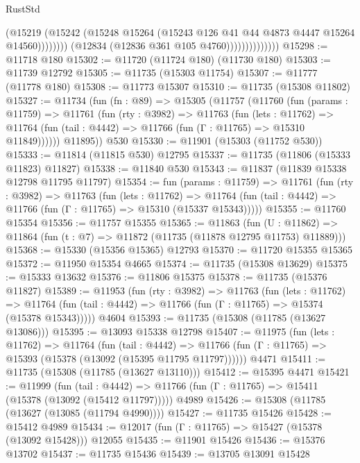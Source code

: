 \begin{lexlean}{RustStd}
\begin{coremodule}
{\begin{coremodule}
{{{{{{{{{{{{{{{{{{{{{{{{{{{{{{{{{{{{{{{{{{{{{{{{{{{{{{{{{{{{{{{{{{{{                                    (@15219
                                      (@15242
                                        (@15248
                                          @15264
                                          (@15243 @126 @41 @44 @4873 @4447 @15264 @14560))))))))
                            (@12834 (@12836 @361 @105 @4760))))))))))))))
@15298 := @11718 @180
@15302 := @11720 (@11724 @180) (@11730 @180)
@15303 := @11739 @12792
@15305 := @11735 (@15303 @11754)
@15307 := @11777 (@11778 @180)
@15308 := @11773 @15307
@15310 := @11735 (@15308 @11802)
@15327 := @11734
    (fun (fn : @89) =>
    @15305
      (@11757
        (@11760
          (fun (params : @11759) =>
          @11761
            (fun (rty : @3982) =>
            @11763
              (fun (lets : @11762) =>
              @11764 (fun (tail : @4442) => @11766 (fun (Γ : @11765) => @15310 @11849))))))
        @11895))
    @530
@15330 := @11901 (@15303 (@11752 @530))
@15333 := @11814 (@11815 @530) @12795
@15337 := @11735 (@11806 (@15333 @11823) @11827)
@15338 := @11840 @530
@15343 := @11837 (@11839 @15338 @12798 @11795 @11797)
@15354 := fun (params : @11759) =>
  @11761
    (fun (rty : @3982) =>
    @11763
      (fun (lets : @11762) =>
      @11764 (fun (tail : @4442) => @11766 (fun (Γ : @11765) => @15310 (@15337 @15343)))))
@15355 := @11760 @15354
@15356 := @11757 @15355
@15365 := @11863
    (fun (U : @11862) => @11864 (fun (t : @7) => @11872 (@11735 (@11878 @12795 @11753) @11889)))
@15368 := @15330 (@15356 @15365) @12793
@15370 := @11720 @15355 @15365
@15372 := @11950 @15354 @4665
@15374 := @11735 (@15308 @13629)
@15375 := @15333 @13632
@15376 := @11806 @15375
@15378 := @11735 (@15376 @11827)
@15389 := @11953
    (fun (rty : @3982) =>
    @11763
      (fun (lets : @11762) =>
      @11764 (fun (tail : @4442) => @11766 (fun (Γ : @11765) => @15374 (@15378 @15343)))))
    @4604
@15393 := @11735 (@15308 (@11785 (@13627 @13086)))
@15395 := @13093 @15338 @12798
@15407 := @11975
    (fun (lets : @11762) =>
    @11764
      (fun (tail : @4442) =>
      @11766 (fun (Γ : @11765) => @15393 (@15378 (@13092 (@15395 @11795 @11797))))))
    @4471
@15411 := @11735 (@15308 (@11785 (@13627 @13110)))
@15412 := @15395 @4471
@15421 := @11999
    (fun (tail : @4442) => @11766 (fun (Γ : @11765) => @15411 (@15378 (@13092 (@15412 @11797)))))
    @4989
@15426 := @15308 (@11785 (@13627 (@13085 (@11794 @4990))))
@15427 := @11735 @15426
@15428 := @15412 @4989
@15434 := @12017 (fun (Γ : @11765) => @15427 (@15378 (@13092 @15428))) @12055
@15435 := @11901 @15426
@15436 := @15376 @13702
@15437 := @11735 @15436
@15439 := @13705 @13091 @15428
}}}}}}}}}}}}}}}}}}}}}}}}}}}}}}}}}}}}}}}}}}}}}}}}}}}}}}}}}}}}}}}}}}}}
\end{coremodule}}
\end{coremodule}
\end{lexlean}
